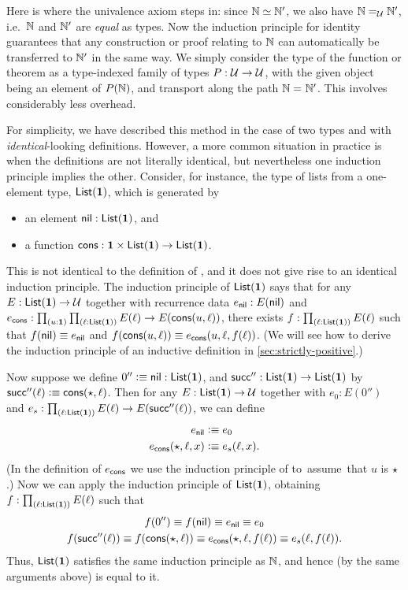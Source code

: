 %
Here is where the univalence axiom steps in: since $\eqv{\nat}{\natp}$, we also have $\id[\type]{\nat}{\natp}$, i.e.\ $\nat$ and $\natp$ are
\emph{equal} as types.
Now the induction principle for identity guarantees that any construction or proof relating to $\nat$ can automatically be transferred to $\natp$ in the same way.
We simply consider the type of the function or theorem as a type-indexed family of types $P:\type\to\type$, with the given object being an element of $P(\nat)$, and transport along the path $\id \nat\natp$.
This involves considerably less overhead.

For simplicity, we have described this method in the case of two types \nat and \natp with \emph{identical}-looking definitions.
However, a more common situation in practice is when the definitions are not literally identical, but nevertheless one induction principle implies the other.
%
%
Consider, for instance, the type of lists from a one-element type, $\lst\unit$, which is generated by
\begin{itemize}
\item an element $\nil:\lst\unit$, and
\item a function $\cons:\unit \times \lst\unit \to\lst\unit$.
\end{itemize}
This is not identical to the definition of \nat, and it does not give rise to an identical induction principle.
The induction principle of $\lst\unit$ says that for any $E:\lst\unit\to\type$ together with recurrence data $e_\nil:E(\nil)$ and $e_\cons : \prd{u:\unit}{\ell:\lst\unit} E(\ell) \to E(\cons(u,\ell))$, there exists $f:\prd{\ell:\lst\unit} E(\ell)$ such that $f(\nil)\jdeq e_\nil$ and $f(\cons(u,\ell))\jdeq e_\cons(u,\ell,f(\ell))$.
(We will see how to derive the induction principle of an inductive definition in \autoref{sec:strictly-positive}.)

Now suppose we define $0'' \defeq \nil: \lst\unit$, and $\suc'':\lst\unit\to\lst\unit$ by $\suc''(\ell) \defeq \cons(\ttt,\ell)$.
Then for any $E:\lst\unit\to\type$ together with $e_0:E(0'')$ and $e_s:\prd{\ell:\lst\unit} E(\ell) \to E(\suc''(\ell))$, we can define
\begin{align*}
  e_\nil &\defeq e_0\\
  e_\cons(\ttt,\ell,x) &\defeq e_s(\ell,x).
\end{align*}
(In the definition of $e_\cons$ we use the induction principle of \unit to assume that $u$ is $\ttt$.)
Now we can apply the induction principle of $\lst\unit$, obtaining $f:\prd{\ell:\lst\unit} E(\ell)$ such that
\begin{gather*}
  f(0'') \jdeq f(\nil) \jdeq e_\nil \jdeq e_0\\
  f(\suc''(\ell)) \jdeq f(\cons(\ttt,\ell)) \jdeq e_\cons(\ttt,\ell,f(\ell)) \jdeq e_s(\ell,f(\ell)).
\end{gather*}
Thus, $\lst\unit$ satisfies the same induction principle as $\nat$, and hence (by the same arguments above) is equal to it.

